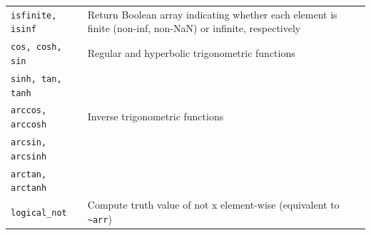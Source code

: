 \begin{table}
\begin{tabularx}{\textwidth}{lX}
        \verb|isfinite, isinf| & Return Boolean array indicating whether each element is finite (non-inf, non-NaN) or infinite, respectively \\
        \verb|cos, cosh, sin|  & Regular and hyperbolic trigonometric functions                                                              \\
        \verb|sinh, tan, tanh| &                                                                                                             \\
        \verb|arccos, arccosh| & Inverse trigonometric functions                                                                             \\
        \verb|arcsin, arcsinh| &                                                                                                             \\
        \verb|arctan, arctanh| &                                                                                                             \\
        \verb|logical_not|     & Compute truth value of not x element-wise (equivalent to \verb|~arr|)                                       \\
        \hline
    \end{tabularx}
\end{table}

